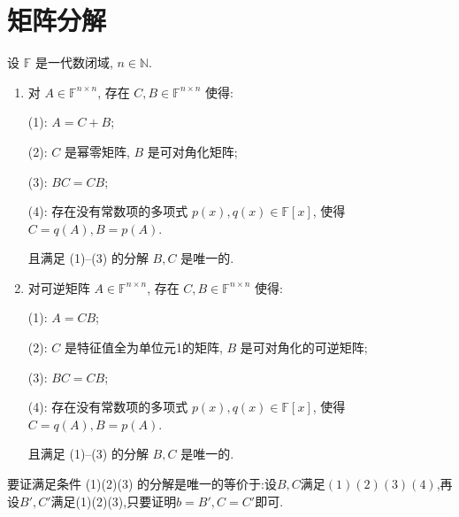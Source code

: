 \documentclass[../../main.tex]{subfiles}%
\begin{document}
\section{矩阵分解}

\begin{theorem}\label{theorem:Jordan-Chevalley分解}
设 \( \mathbb{F} \) 是一代数闭域, \( n \in \mathbb{N} \).
\begin{enumerate}
\item 对 \( A \in \mathbb{F}^{n \times n} \), 存在 \( C, B \in \mathbb{F}^{n \times n} \) 使得:

(1): \( A = C + B \);

(2): \( C \) 是幂零矩阵, \( B \) 是可对角化矩阵;

(3): \( BC = CB \);

(4): 存在没有常数项的多项式 \( p(x), q(x) \in \mathbb{F}[x] \), 使得 \( C = q(A), B = p(A) \). 

且满足 (1)--(3) 的分解 \( B, C \) 是唯一的.


\item  对可逆矩阵 \( A \in \mathbb{F}^{n \times n} \), 存在 \( C, B \in \mathbb{F}^{n \times n} \) 使得:

(1): \( A = CB \);

(2): \( C \) 是特征值全为单位元1的矩阵, \( B \) 是可对角化的可逆矩阵;

(3): \( BC = CB \);

(4): 存在没有常数项的多项式 \( p(x), q(x) \in \mathbb{F}[x] \), 使得 \( C = q(A), B = p(A) \).

且满足 (1)--(3) 的分解 \( B, C \) 是唯一的.
\end{enumerate}
\end{theorem}
\begin{remark}
要证满足条件 (1)(2)(3) 的分解是唯一的等价于:设$B,C$满足$(1)(2)(3)(4)$,再设$B',C'$满足(1)(2)(3),只要证明$b=B',C=C'$即可.
\end{remark}
\end{document}
